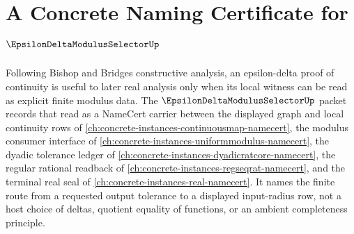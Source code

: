 \chapter{A Concrete Naming Certificate for $\EpsilonDeltaModulusSelectorUp$}
\label{ch:concrete-instances-epsilon-delta-modulus-selector-namecert}

Following Bishop and Bridges constructive analysis, an epsilon-delta proof of continuity is useful to later real analysis only when its local witness can be read as explicit finite modulus data. The $\EpsilonDeltaModulusSelectorUp$ packet records that read as a NameCert carrier between the displayed graph and local continuity rows of \autoref{ch:concrete-instances-continuousmap-namecert}, the modulus consumer interface of \autoref{ch:concrete-instances-uniformmodulus-namecert}, the dyadic tolerance ledger of \autoref{ch:concrete-instances-dyadicratcore-namecert}, the regular rational readback of \autoref{ch:concrete-instances-regseqrat-namecert}, and the terminal real seal of \autoref{ch:concrete-instances-real-namecert}. It names the finite route from a requested output tolerance to a displayed input-radius row, not a host choice of deltas, quotient equality of functions, or an ambient completeness principle.

